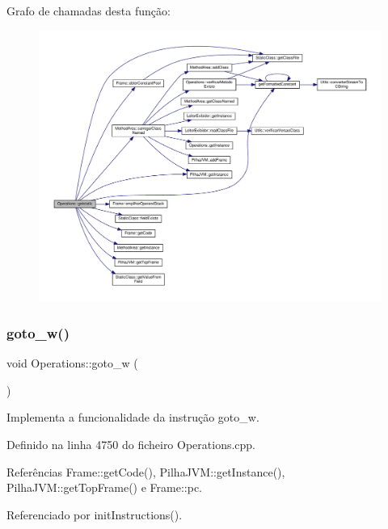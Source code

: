 Grafo de chamadas desta função\+:\nopagebreak
\begin{figure}[H]
\begin{center}
\leavevmode
\includegraphics[width=350pt]{classOperations_a0514422a81aa3efa5cb8b3bd1a505a68_cgraph}
\end{center}
\end{figure}
\mbox{\label{classOperations_aed8436ead5dfcaef69b24e1b2fff7744}} 
\subsubsection{\texorpdfstring{goto\+\_\+w()}{goto\_w()}}
{\footnotesize\ttfamily void Operations\+::goto\+\_\+w (\begin{DoxyParamCaption}{ }\end{DoxyParamCaption})\hspace{0.3cm}{\ttfamily [private]}}



Implementa a funcionalidade da instrução goto\+\_\+w. 



Definido na linha 4750 do ficheiro Operations.\+cpp.



Referências Frame\+::get\+Code(), Pilha\+J\+V\+M\+::get\+Instance(), Pilha\+J\+V\+M\+::get\+Top\+Frame() e Frame\+::pc.



Referenciado por init\+Instructions().


